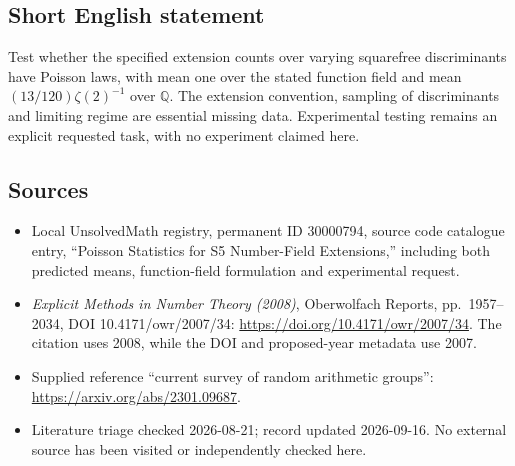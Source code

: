 \documentclass[11pt]{article}
\newcommand{\Q}{\mathbb{Q}}
\begin{document}
\subsection{Short English statement}
Test whether the specified extension counts over varying squarefree discriminants have Poisson laws, with mean one over the stated function field and mean \((13/120)\zeta(2)^{-1}\) over \(\Q\). The extension convention, sampling of discriminants and limiting regime are essential missing data. Experimental testing remains an explicit requested task, with no experiment claimed here.
\subsection{Sources}
\begin{itemize}
\item Local UnsolvedMath registry, permanent ID 30000794, source code catalogue entry, ``Poisson Statistics for S5 Number-Field Extensions,'' including both predicted means, function-field formulation and experimental request.
\item \emph{Explicit Methods in Number Theory (2008)}, Oberwolfach Reports, pp.\ 1957--2034, DOI 10.4171/owr/2007/34: \url{https://doi.org/10.4171/owr/2007/34}. The citation uses 2008, while the DOI and proposed-year metadata use 2007.
\item Supplied reference ``current survey of random arithmetic groups'': \url{https://arxiv.org/abs/2301.09687}.
\item Literature triage checked 2026-08-21; record updated 2026-09-16. No external source has been visited or independently checked here.
\end{itemize}
\end{document}
